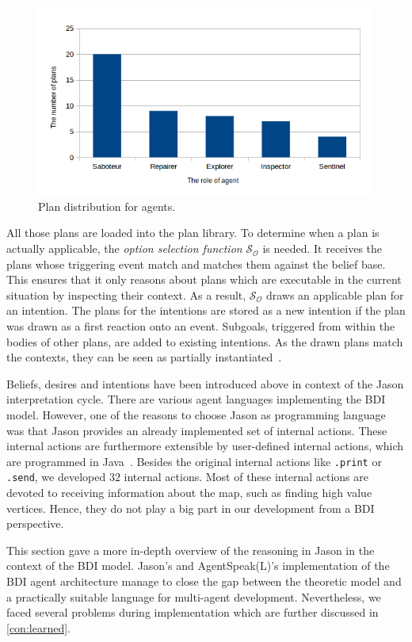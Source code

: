 \begin{figure}
  \centering
  \includegraphics[width=\textwidth]{images/BDI_plan_distribution_role}
  \caption{Plan distribution for agents.}
  \label{fig:baselinex}
\end{figure}

All those plans are loaded into the plan library.
To determine when a plan is actually applicable, the \emph{option selection function} $\mathcal{S_O}$ is needed.
It receives the plans whose triggering event match and matches them against the belief base.
This ensures that it only reasons about plans which are executable in the current situation by inspecting their context.
As a result, $\mathcal{S_O}$ draws an applicable plan for an intention.
The plans for the intentions are stored as a new intention if the plan was drawn as a first reaction onto an event.
Subgoals, triggered from within the bodies of other plans, are added to existing intentions.
As the drawn plans match the contexts, they can be seen as partially instantiated~\cite{rafel_Javabased_2007}.

Beliefs, desires and intentions have been introduced above in context of the Jason interpretation cycle.
There are various agent languages implementing the BDI model.
However, one of the reasons to choose Jason as programming language was that Jason provides an already implemented set of internal actions.
These internal actions are furthermore extensible by user-defined internal actions, which are programmed in Java~\cite{rafael_Javabased_2007}.
Besides the original internal actions like \texttt{.print} or \texttt{.send}, we developed $32$ internal actions.
Most of these internal actions are devoted to receiving information about the map, such as finding high value vertices.
Hence, they do not play a big part in our development from a BDI perspective.

This section gave a more in-depth overview of the reasoning in Jason in the context of the BDI model.
Jason's and AgentSpeak(L)'s implementation of the BDI agent architecture manage to close the gap between the theoretic model and a practically suitable language for multi-agent development.
Nevertheless, we faced several problems during implementation which are further discussed in \autoref{con:learned}.
